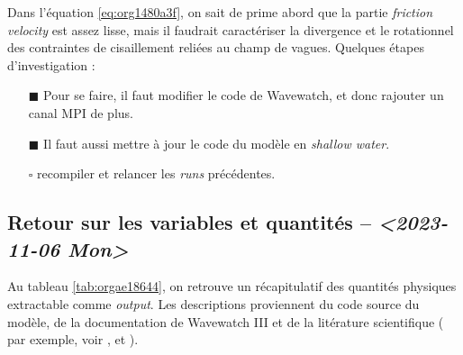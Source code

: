 \documentclass[10pt]{article}
\numberwithin{equation}{section}
\renewcommand{\boxtimes}{\blacksquare}
\begin{document}
Dans l'équation \ref{eq:org1480a3f}, on sait de prime abord que la partie \emph{friction velocity} est assez lisse, mais il faudrait caractériser la divergence et le rotationnel des contraintes de cisaillement reliées au champ de vagues.
Quelques étapes d'investigation : 
\begin{itemize}
\item[{$\boxtimes$}] Pour se faire, il faut modifier le code de Wavewatch, et donc rajouter un canal MPI de plus.
\item[{$\boxtimes$}] Il faut aussi mettre à jour le code du modèle en \emph{shallow water}.
\item[{$\square$}] recompiler et relancer les \emph{runs} précédentes.
\end{itemize}

\subsection{Retour sur les variables et quantités -- \textit{<2023-11-06 Mon>}}
\label{sec:org0260c0d}

Au tableau \ref{tab:orgae18644}, on retrouve un récapitulatif des quantités physiques extractable comme \emph{output}.
Les descriptions proviennent du code source du modèle, de la documentation de Wavewatch III et de la litérature scientifique ( par exemple, voir , \citep{couvelard2020development} et \citet*{wu_breivik_2019}).
\end{document}
